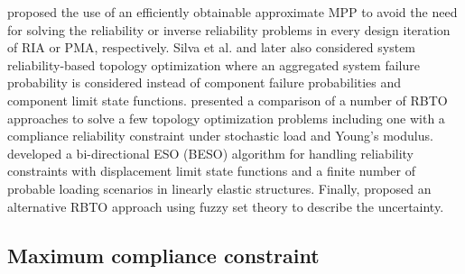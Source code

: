     \cite{Silva2010} proposed the use of an efficiently obtainable approximate MPP to avoid the need for solving the reliability or inverse reliability problems in every design iteration of RIA or PMA, respectively. Silva et al. and later \cite{Nguyen2011} also considered system reliability-based topology optimization where an aggregated system failure probability is considered instead of component failure probabilities and component limit state functions. \cite{Zhao2016} presented a comparison of a number of RBTO approaches to solve a few topology optimization problems including one with a compliance reliability constraint under stochastic load and Young's modulus. \cite{Jalalpour2016} developed a bi-directional ESO (BESO) \citep{YM1992,XY1998,Huang2010a} algorithm for handling reliability constraints with displacement limit state functions and a finite number of probable loading scenarios in linearly elastic structures. Finally, \cite{Yin2018} proposed an alternative RBTO approach using fuzzy set theory to describe the uncertainty.

  \subsection{Maximum compliance constraint}

